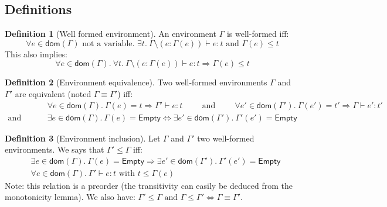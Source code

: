 \documentclass[a4paper]{article}%
\newcommand{\dom}[1]{\textsf{dom}(#1)}
\newcommand{\Empty} {\textsf{Empty}}%
\theoremstyle{definition}
\newtheorem{definition}{Definition}
\begin{document}
      \subsection{Definitions}

      \begin{definition}[Well formed environment]
        An environment $\Gamma$ is well-formed iff:
        \[
          \forall e \in \dom \Gamma \text{ not a variable. } \exists t.\ \Gamma\setminus(e:\Gamma(e)) \vdash e : t \text{ and } \Gamma(e) \leq t
        \]
        This also implies:
        \[
          \forall e \in \dom \Gamma.\ \forall t.\ \Gamma\setminus(e:\Gamma(e)) \vdash e : t \Rightarrow \Gamma(e) \leq t
        \]
      \end{definition}

      \begin{definition}[Environment equivalence]
        Two well-formed environments $\Gamma$ and $\Gamma'$ are equivalent (noted $\Gamma \equiv \Gamma'$) iff:
        \begin{align*} 
          &\forall e \in \dom \Gamma.\ \Gamma(e)=t \Rightarrow \Gamma' \vdash e:t \hspace{1cm} \text{and} \hspace{1cm}
          \forall e' \in \dom {\Gamma'}.\ \Gamma(e')=t' \Rightarrow \Gamma \vdash e':t' \\
          \text{and} \hspace{1cm} &\exists e\in \dom \Gamma.\ \Gamma(e)=\Empty \Leftrightarrow \exists e'\in \dom {\Gamma'}.\ \Gamma'(e')=\Empty
        \end{align*}
      \end{definition}
    
      \begin{definition}[Environment inclusion]
        Let $\Gamma$ and $\Gamma'$ two well-formed environments. We says that $\Gamma' \leq \Gamma$ iff:
        \begin{align*}
          &\exists e\in \dom \Gamma.\ \Gamma(e)=\Empty \Rightarrow \exists e'\in \dom {\Gamma'}.\ \Gamma'(e')=\Empty\\
          &\forall e \in \dom \Gamma.\ \Gamma' \vdash e : t \text{ with } t \leq \Gamma(e)
        \end{align*}
        Note: this relation is a preorder (the transitivity can easily be deduced from the monotonicity lemma).
        We also have: $\Gamma' \leq \Gamma \text{ and } \Gamma \leq \Gamma' \Leftrightarrow \Gamma \equiv \Gamma'$.
      \end{definition}
    
\end{document}

